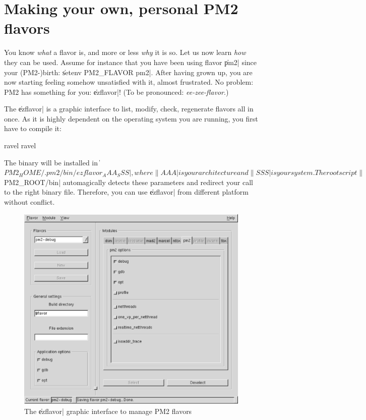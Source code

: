 \section{Making your own, personal PM2 flavors}

You know \emph{what} a flavor is, and more or less \emph{why} it is
so. Let us now learn \emph{how} they can be used. Assume for instance
that you have been using flavor \|pm2| since your (PM2-)birth:
\|setenv PM2_FLAVOR pm2|. After having grown up, you are now starting
feeling somehow unsatisfied with it, almost frustrated. No problem:
PM2 has something for you: \|ezflavor|! (To be pronounced:
\emph{ee-zee-flavor}.)

The \|ezflavor| is a graphic interface to list, modify, check,
regenerate flavors all in once. As it is highly dependent on the
operating system you are running, you first have to compile it:
\begin{shell}
ravel%
ravel%
\end{shell}
The binary will be installed in
\|${PM2_HOME}/.pm2/bin/ezflavor_AAA_SSS|, where \|AAA| is your
architecture and \|SSS| is your system. The root script
\|${PM2_ROOT}/bin| automagically detects these parameters and redirect
your call to the right binary file.  Therefore, you can use \|ezflavor|
from different platform without conflict.

\begin{figure}
\begin{center}
\includegraphics[width=0.7\linewidth]{Figures/ezflavor.eps}
\end{center}
\caption{The \|ezflavor| graphic interface to manage PM2 flavors}
\label{fig:ezflavor}
\end{figure}

